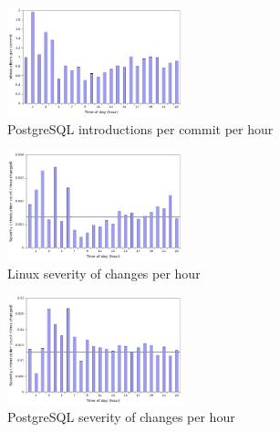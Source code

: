 \begin{figure}
\begin{center}
\includegraphics[width=0.45\textwidth]{postgresql-introductions-hour.pdf}
\end{center}
\caption{PostgreSQL introductions per commit per hour}
\label{fig-postgresql-introductions-hour}
\end{figure}


\begin{figure}
\begin{center}
\includegraphics[width=0.45\textwidth]{linux-severity-hour.pdf}
\end{center}
\caption{Linux severity of changes per hour}
\label{fig-linux-severity-hour}
\end{figure}

\begin{figure}
\begin{center}
\includegraphics[width=0.45\textwidth]{postgresql-severity-hour.pdf}
\end{center}
\caption{PostgreSQL severity of changes per hour}
\label{fig-postgresql-severity-hour}
\end{figure}
